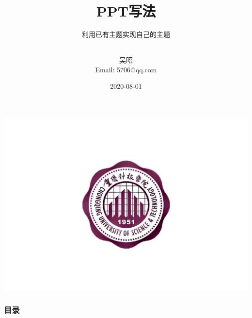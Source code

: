 \documentclass[aspectratio=169, 10pt, utf8, mathserif]{beamer}
\numberwithin{equation}{section} %
\numberwithin{figure}{section} %
\begin{document}
\title[重庆科技学院\quad PPT写法] %
{ \textsc{PPT写法} }
\subtitle{利用已有主题实现自己的主题}
\author[吴昭] %
{\quad\\  \large  吴昭\\ {\scriptsize Email: 5706@qq.com}}
\date {\scriptsize{2020-08-01}}%


\begin{frame} %
  \vspace{0.5cm}
  \titlepage
  \includegraphics[width=\paperwidth]{cqust_logo.pdf}
  \hypertarget{beginning}{}
\end{frame}



\begin{frame}
	\frametitle{目录}
	\tableofcontents[hideallsubsections]
\end{frame}
\end{document}
